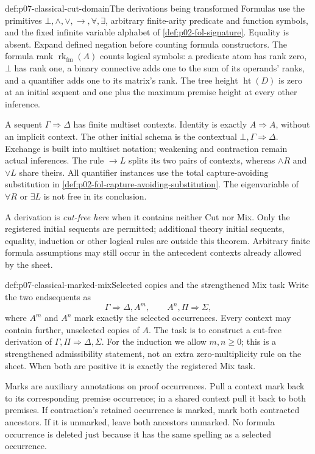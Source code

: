 \begin{hbdefinition}{def:p07-classical-cut-domain}{The derivations being transformed}
Formulas use the primitives
\(\bot,\land,\lor,\to,\forall,\exists\), arbitrary finite-arity
predicate and function symbols, and the fixed infinite variable alphabet
of \cref{def:p02-fol-signature}. Equality is absent. Expand defined
negation before counting formula constructors.
The formula rank \(\operatorname{rk}_{\mathrm{fm}}(A)\) counts logical
symbols: a predicate atom has rank zero, \(\bot\) has rank one, a binary
connective adds one to the sum of its operands' ranks, and a quantifier
adds one to its matrix's rank. The tree height \(\operatorname{ht}(D)\)
is zero at an initial sequent and one plus the maximum premise height
at every other inference.

A sequent \(\Gamma\Rightarrow\Delta\) has finite multiset contexts.
Identity is exactly \(A\Rightarrow A\), without an implicit context.
The other initial schema is the contextual
\(\bot,\Gamma\Rightarrow\Delta\). Exchange is built into multiset
notation; weakening and contraction remain actual inferences.
The rule \(\to L\) splits its two pairs of contexts, whereas
\(\land R\) and \(\lor L\) share theirs.
All quantifier instances use the total capture-avoiding substitution in
\cref{def:p02-fol-capture-avoiding-substitution}. The eigenvariable of
\(\forall R\) or \(\exists L\) is not free in its conclusion.

A derivation is \emph{cut-free here} when it contains neither Cut nor Mix.
Only the registered initial sequents are permitted; additional theory
initial sequents, equality, induction or other logical rules are outside
this theorem. Arbitrary finite formula assumptions may still occur in
the antecedent contexts already allowed by the sheet.
\end{hbdefinition}

\begin{hbdefinition}{def:p07-classical-marked-mix}{Selected copies and the strengthened Mix task}
Write the two endsequents as
\[
 \Gamma\Rightarrow\Delta,A^m,
 \qquad A^n,\Pi\Rightarrow\Sigma,
\]
where \(A^m\) and \(A^n\) mark exactly the selected occurrences.
Every context may contain further, unselected copies of \(A\).
The task is to construct a cut-free derivation of
\(\Gamma,\Pi\Rightarrow\Delta,\Sigma\).
For the induction we allow \(m,n\geq0\); this is a strengthened
admissibility statement, not an extra zero-multiplicity rule on the sheet.
When both are positive it is exactly the registered Mix task.

Marks are auxiliary annotations on proof occurrences. Pull a context mark
back to its corresponding premise occurrence; in a shared context pull it
back to both premises. If contraction's retained occurrence is marked,
mark both contracted ancestors. If it is unmarked, leave both ancestors
unmarked. No formula occurrence is deleted just because it has the same
spelling as a selected occurrence.
\end{hbdefinition}


